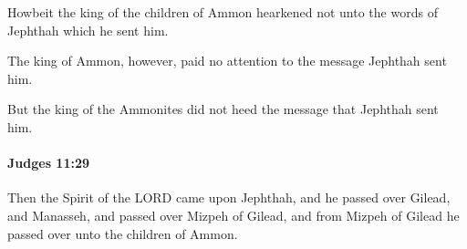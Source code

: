 			\begin{versebox}
					\item[BHS] 
					\item[ASV] Howbeit the king of the children of Ammon hearkened not unto the words of Jephthah which he sent him.
					\item[NIV] The king of Ammon, however, paid no attention to the message Jephthah sent him.
					\item[NRSV] But the king of the Ammonites did not heed the message that Jephthah sent him.
			\end{versebox}

		\paragraph{Judges 11:29} %
			\label{JUDGES-11-29}

			Then the Spirit of the LORD came upon Jephthah, and he passed over Gilead, and Manasseh, and passed over Mizpeh of Gilead, and from Mizpeh of Gilead he passed over unto the children of Ammon.


